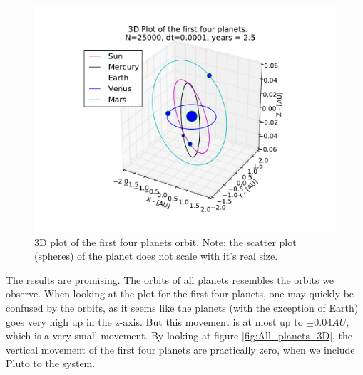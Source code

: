 \documentclass{article}
\begin{document}
\begin{figure}[!h]
\centering
\includegraphics[width=\linewidth]{Plots/First_planets_3D_plot.pdf}
\caption{3D plot of the first four planets orbit. Note: the scatter plot (spheres) of the planet does not scale with it's real size.}
\label{fig:First4_planets_3D}
\end{figure}
The results are promising. The orbits of all planets resembles the orbits we observe. When looking at the plot for the first four planets, one may quickly be confused by the orbits, as it seems like the planets (with the exception of Earth) goes very high up in the z-axis. But this movement is at most up to $\pm 0.04AU$, which is a very small movement. By looking at figure \ref{fig:All_planets_3D}, the vertical movement of the first four planets are practically zero, when we include Pluto to the system.

\FloatBarrier
\end{document}
